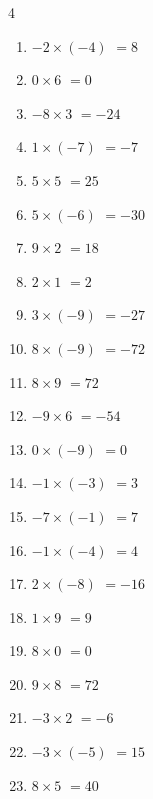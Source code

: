 \begin{multicols}{4}
\begin{enumerate}
  \item $-2\times (-4)$
        $=8$

  \item $0\times 6$
        $=0$

  \item $-8\times 3$
        $=-24$

  \item $1\times (-7)$
        $=-7$

  \item $5\times 5$
        $=25$

  \item $5\times (-6)$
        $=-30$

  \item $9\times 2$
        $=18$

  \item $2\times 1$
        $=2$

  \item $3\times (-9)$
        $=-27$

  \item $8\times (-9)$
        $=-72$

  \item $8\times 9$
        $=72$

  \item $-9\times 6$
        $=-54$

  \item $0\times (-9)$
        $=0$

  \item $-1\times (-3)$
        $=3$

  \item $-7\times (-1)$
        $=7$

  \item $-1\times (-4)$
        $=4$

  \item $2\times (-8)$
        $=-16$

  \item $1\times 9$
        $=9$

  \item $8\times 0$
        $=0$

  \item $9\times 8$
        $=72$

  \item $-3\times 2$
        $=-6$

  \item $-3\times (-5)$
        $=15$

  \item $8\times 5$
        $=40$


\end{enumerate}
\end{multicols}
